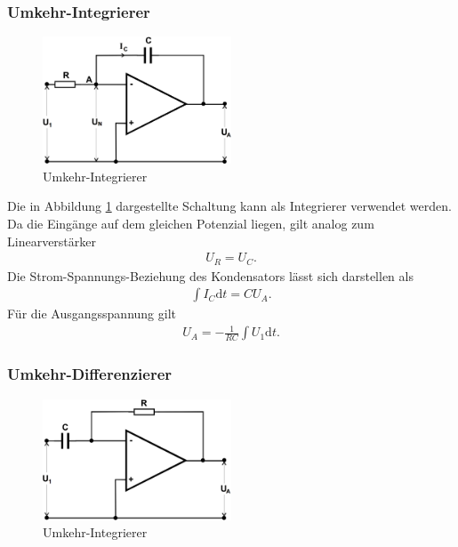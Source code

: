 \subsubsection{Umkehr-Integrierer}

\begin{figure}
	\centering
	\includegraphics[width=0.5\textwidth]{img/int.png}
	\caption{Umkehr-Integrierer \cite{v51}}
	\label{fig:int}
\end{figure}

Die in Abbildung \ref{fig:int} dargestellte Schaltung kann als Integrierer verwendet werden.
Da die Eingänge auf dem gleichen Potenzial liegen, gilt analog zum Linearverstärker
\begin{align}
	U_R = U_C.
\end{align}
Die Strom-Spannungs-Beziehung des Kondensators lässt sich darstellen als
\begin{align}
	\int I_C \text{d}t = C U_A.
\end{align}
Für die Ausgangsspannung gilt
\begin{align}
	U_A = -\frac{1}{RC} \int U_1 \text{d}t.
\end{align}


\subsubsection{Umkehr-Differenzierer}

\begin{figure}
	\centering
	\includegraphics[width=0.5\textwidth]{img/diff.png}
	\caption{Umkehr-Integrierer \cite{v51}}
	\label{fig:diff}
\end{figure}

